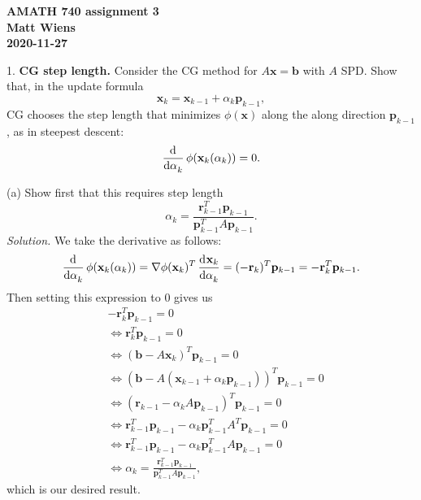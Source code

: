 \documentclass{article}
\def\*#1{\mathbf{#1}}
\begin{document}
\textbf{AMATH 740 assignment 3} \\
\textbf{Matt Wiens} \\
\textbf{2020-11-27}

1. \textbf{CG step length.}
Consider the CG method for $A \*x = \*b$ with $A$ SPD. Show that, in the update formula
%
\begin{equation*}
    \*x_k = \*x_{k - 1} + \alpha_k \*p_{k - 1}
    ,
\end{equation*}
%
CG chooses the step length that minimizes $\phi(\*x)$ along the along direction $\*p_{k - 1}$,
as in steepest descent:
%
\begin{equation*}
    \dod{}{\alpha_k} \phi(\*x_k(\alpha_k)) = 0.
\end{equation*}

(a) Show first that this requires step length
%
\begin{equation*}
    \alpha_k = \frac{\*r_{k - 1}^T \*p_{k - 1}}{\*p_{k - 1}^T A \*p_{k - 1}}
    .
\end{equation*}
%
\textit{Solution.}
We take the derivative as follows:
%
\begin{equation*}
    \dod{}{\alpha_k} \phi(\*x_k(\alpha_k))
        = \nabla \phi(\*x_k)^T \dod{\*x_k}{\alpha_k}
        = (-\*r_k)^T \*p_{k - 1}
        = - \*r_k^T \*p_{k - 1}
        .
\end{equation*}
%
Then setting this expression to $0$ gives us
%
\begin{align*}
    &- \*r_k^T \*p_{k - 1} = 0 \\
    &\iff \*r_k^T \*p_{k - 1} = 0 \\
    &\iff (\*b - A \*x_k)^T \*p_{k - 1} = 0 \\
    &\iff (\*b - A (\*x_{k - 1} + \alpha_k \*p_{k - 1}))^T \*p_{k - 1} = 0 \\
    &\iff (\*r_{k - 1} - \alpha_k A \*p_{k - 1})^T \*p_{k - 1} = 0 \\
    &\iff \*r_{k - 1}^T \*p_{k - 1} - \alpha_k \*p_{k - 1}^T A^T \*p_{k - 1} = 0 \\
    &\iff \*r_{k - 1}^T \*p_{k - 1} - \alpha_k \*p_{k - 1}^T A \*p_{k - 1} = 0 \\
    &\iff \alpha_k = \frac{\*r_{k - 1}^T \*p_{k - 1}}{\*p_{k - 1}^T A \*p_{k - 1}},
\end{align*}
%
which is our desired result.

\vspace{5mm}
\end{document}
